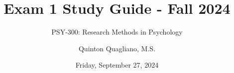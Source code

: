\documentclass[
  12pt,
  letterpaper,
]{scrartcl}
\title{Exam 1 Study Guide - Fall 2024}
\subtitle{PSY-300: Research Methods in Psychology}
\author{Quinton Quagliano, M.S.}
\date{Friday, September 27, 2024}
\begin{document}


\begin{titlepage}


\newcommand{\titlepagepagealign}{
\ifthenelse{\equal{center}{right}}{\raggedleft}{}
\ifthenelse{\equal{center}{center}}{\centering}{}
\ifthenelse{\equal{center}{left}}{\raggedright}{}
}


\newcommand{\titleandsubtitle}{
{{\huge{\bfseries{\nohyphens{Exam 1 Study Guide - Fall 2024}}}}\par
}%

\vspace{\betweentitlesubtitle}
{
{\Large{\nohyphens{PSY-300: Research Methods in Psychology}}}\par
}}
\newcommand{\titlepagetitleblock}{
\newcommand{\HRule}{\rule{\linewidth}{0.5mm}} 

\HRule\\[0.4cm]

\titleandsubtitle

\HRule\\
}
\newcommand{\authorstyle}[1]{{\small{#1}}}

\newcommand{\affiliationstyle}[1]{{\small{#1}}}

\newcommand{\titlepageauthorblock}{
\newlength{\miniA}
\setlength{\miniA}{0pt}
\newlength{\namelen}
\settowidth{\namelen}{Quinton Quagliano,
M.S.}\setlength{\miniA}{\maxof{\miniA}{\namelen}}
\setlength{\miniA}{\miniA+0.05\textwidth}
\newlength{\miniB}
\setlength{\miniB}{0.99\textwidth - \miniA}
\begin{minipage}{\miniA}
\begin{flushleft}
{\authorstyle{Quinton Quagliano, M.S.}}
\end{flushleft}
\end{minipage}
\begin{minipage}{\miniB}
\begin{flushright}
{\affiliationstyle{Department of Psychology
\\}}
\end{flushright}
\end{minipage}}

\newcommand{\titlepageaffiliationblock}{}
\newcommand{\headerstyled}{%
{\textsc{\LARGE{}}}
}
\newcommand{\footerstyled}{%
{}
}
\newcommand{\datestyled}{%
{\large{Friday, September 27, 2024}}
}


\newcommand{\titlepageheaderblock}{\headerstyled}


\end{titlepage}
\end{document}
